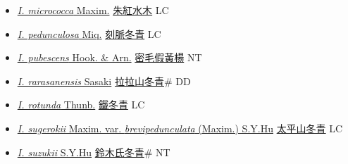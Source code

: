 \begin{itemize}
\begin{itemize}
        \item[] \href{http://www.theplantlist.org/tpl1.1/search?q=Ilex+micrococca}{\textit{I. micrococca} Maxim.}   \href{\detokenize{http://taibnet.sinica.edu.tw/chi/taibnet_species_list.php?T2=朱紅水木&T2_new_value=true&fr=y}}{朱紅水木} LC
        \item[] \href{http://www.theplantlist.org/tpl1.1/search?q=Ilex+pedunculosa}{\textit{I. pedunculosa} Miq.}   \href{\detokenize{http://taibnet.sinica.edu.tw/chi/taibnet_species_list.php?T2=刻脈冬青&T2_new_value=true&fr=y}}{刻脈冬青} LC
        \item[] \href{http://www.theplantlist.org/tpl1.1/search?q=Ilex+pubescens}{\textit{I. pubescens} Hook. \& Arn.}   \href{\detokenize{http://taibnet.sinica.edu.tw/chi/taibnet_species_list.php?T2=密毛假黃楊&T2_new_value=true&fr=y}}{密毛假黃楊} NT
        \item[] \href{http://www.theplantlist.org/tpl1.1/search?q=Ilex+rarasanensis}{\textit{I. rarasanensis} Sasaki}   \href{\detokenize{http://taibnet.sinica.edu.tw/chi/taibnet_species_list.php?T2=拉拉山冬青&T2_new_value=true&fr=y}}{拉拉山冬青}\# DD
        \item[] \href{http://www.theplantlist.org/tpl1.1/search?q=Ilex+rotunda}{\textit{I. rotunda} Thunb.}   \href{\detokenize{http://taibnet.sinica.edu.tw/chi/taibnet_species_list.php?T2=鐵冬青&T2_new_value=true&fr=y}}{鐵冬青} LC
        \item[] \href{http://www.theplantlist.org/tpl1.1/search?q=Ilex+sugerokii+var.+brevipedunculata}{\textit{I. sugerokii} Maxim. var. \textit{brevipedunculata} (Maxim.) S.Y.Hu}   \href{\detokenize{http://taibnet.sinica.edu.tw/chi/taibnet_species_list.php?T2=太平山冬青&T2_new_value=true&fr=y}}{太平山冬青} LC
        \item[] \href{http://www.theplantlist.org/tpl1.1/search?q=Ilex+suzukii}{\textit{I. suzukii} S.Y.Hu}   \href{\detokenize{http://taibnet.sinica.edu.tw/chi/taibnet_species_list.php?T2=鈴木氏冬青&T2_new_value=true&fr=y}}{鈴木氏冬青}\# NT

\end{itemize}
\end{itemize}
